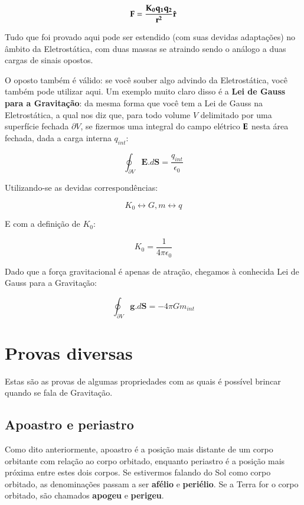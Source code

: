 \[
	\bf{F} = \frac{K_0 q_1 q_2}{r^2}\hat{\bf{r}}
\]

Tudo que foi provado aqui pode ser estendido (com suas devidas adaptações) no âmbito da Eletrostática, com duas massas se atraindo sendo o análogo a duas cargas de sinais opostos.{\\}

O oposto também é válido: se você souber algo advindo da Eletrostática, você também pode utilizar aqui. Um exemplo muito claro disso é a \textbf{Lei de Gauss para a Gravitação}: da mesma forma que você tem a Lei de Gauss na Eletrostática, a qual nos diz que, para todo volume $V$ delimitado por uma superfície fechada $\partial V$, se fizermos uma integral do campo elétrico $\bf{E}$ nesta área fechada, dada a carga interna $q_{int}$:

\[
	\oint_{\partial V} \mathbf{E}.d\mathbf{S} = \frac{q_{int}}{\epsilon_0}
\]

Utilizando-se as devidas correspondências:

\[
	K_0 \leftrightarrow G, m \leftrightarrow q
\]

E com a definição de $K_0$:

\[
	K_0 = \frac{1}{4 \pi \epsilon_0}
\]

Dado que a força gravitacional é apenas de atração, chegamos à conhecida Lei de Gauss para a Gravitação:

\begin{equation}
	\oint_{\partial V} \mathbf{g}.d\mathbf{S} = -4 \pi G m_{int}
	\label{eq65}
\end{equation}

\newpage

\section{Provas diversas}

Estas são as provas de algumas propriedades com as quais é possível brincar quando se fala de Gravitação.

\subsection{Apoastro e periastro}

Como dito anteriormente, apoastro é a posição mais distante de um corpo orbitante com relação ao corpo orbitado, enquanto periastro é a posição mais próxima entre estes dois corpos. Se estivermos falando do Sol como corpo orbitado, as denominações passam a ser \textbf{afélio} e \textbf{periélio}. Se a Terra for o corpo orbitado, são chamados \textbf{apogeu} e \textbf{perigeu}.{\\}

